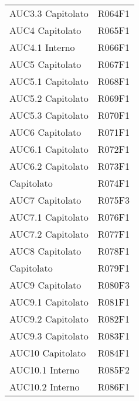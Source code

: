 \documentclass[../analisi-dei-requisiti.tex]{subfiles}
\begin{document}
\begin{longtable}[H]{ p{4cm} | p{4cm} }
  AUC3.3 Capitolato             & R064F1                               \\
  AUC4 Capitolato               & R065F1                               \\
  AUC4.1 Interno                & R066F1                               \\
  AUC5 Capitolato               & R067F1                               \\
  AUC5.1 Capitolato             & R068F1                               \\
  AUC5.2 Capitolato             & R069F1                               \\
  AUC5.3 Capitolato             & R070F1                               \\
  AUC6 Capitolato               & R071F1                               \\
  AUC6.1 Capitolato             & R072F1                               \\
  AUC6.2 Capitolato             & R073F1                               \\
  Capitolato                    & R074F1                               \\
  AUC7 Capitolato               & R075F3                               \\
  AUC7.1 Capitolato             & R076F1                               \\
  AUC7.2 Capitolato             & R077F1                               \\
  AUC8 Capitolato               & R078F1                               \\
  Capitolato                    & R079F1                               \\
  AUC9 Capitolato               & R080F3                               \\
  AUC9.1 Capitolato             & R081F1                               \\
  AUC9.2 Capitolato             & R082F1                               \\
  AUC9.3 Capitolato             & R083F1                               \\
  AUC10 Capitolato              & R084F1                               \\
  AUC10.1 Interno               & R085F2                               \\
  AUC10.2 Interno               & R086F1                               \\

\end{longtable}
\end{document}
